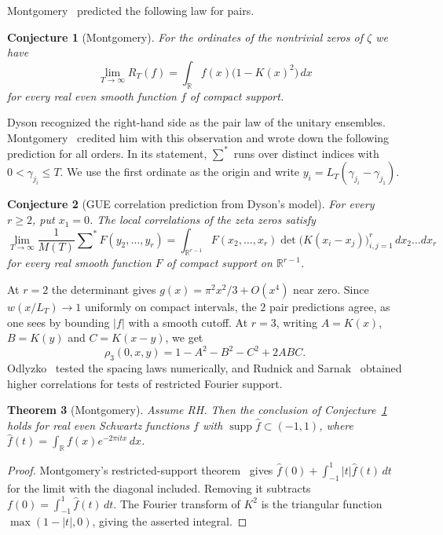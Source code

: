 \documentclass[11pt,a4paper]{article}
\newtheorem{thm}{Theorem}[section]
\newtheorem{conj}[thm]{Conjecture}
\begin{document}
Montgomery~\cite{montgomery} predicted the following law for pairs.

\begin{samepage}
\begin{conj}[Montgomery]\label{pair}
For the ordinates of the nontrivial zeros of $\zeta$ we have
\[
 \lim_{T\to\infty}R_T(f)=\int_{\mathbb R} f(x)\big(1-K(x)^2\big)\,dx
\]
for every real even smooth function $f$ of compact support.
\end{conj}
\end{samepage}

Dyson recognized the right-hand side as the pair law of the unitary ensembles. Montgomery~\cite{montgomery} credited him with this observation and wrote down the following prediction for all orders. In its statement, $\sum^*$ runs over distinct indices with $0<\gamma_{j_i}\leq T$. We use the first ordinate as the origin and write $y_i=L_T(\gamma_{j_i}-\gamma_{j_1})$.

\begin{samepage}
\begin{conj}[GUE correlation prediction from Dyson's model]\label{gue-prediction}
For every $r\geq2$, put $x_1=0$. The local correlations of the zeta zeros satisfy
\[
 \lim_{T\to\infty}\frac1{M(T)}\sum\nolimits^* F(y_2,\ldots,y_r)
 =\int_{\mathbb R^{r-1}} F(x_2,\ldots,x_r)
       \det\big(K(x_i-x_j)\big)_{i,j=1}^r\,dx_2\ldots dx_r
\]
for every real smooth function $F$ of compact support on $\mathbb R^{r-1}$.
\end{conj}
\end{samepage}

At $r=2$ the determinant gives $g(x)=\pi^2x^2/3+O(x^4)$ near zero. Since $w(x/L_T)\to1$ uniformly on compact intervals, the $2$ pair predictions agree, as one sees by bounding $|f|$ with a smooth cutoff. At $r=3$, writing $A=K(x)$, $B=K(y)$ and $C=K(x-y)$, we get
\[
 \rho_3(0,x,y)=1-A^2-B^2-C^2+2ABC.
\]
Odlyzko~\cite{odlyzko} tested the spacing laws numerically, and Rudnick and Sarnak~\cite{rs} obtained higher correlations for tests of restricted Fourier support.

\begin{samepage}
\begin{thm}[Montgomery]\label{restricted-pairs}
Assume RH. Then the conclusion of Conjecture~\textup{\ref{pair}} holds for real even Schwartz functions $f$ with $\operatorname{supp}\widehat f\subset(-1,1)$, where $\widehat f(t)=\int_{\mathbb R}f(x)e^{-2\pi itx}\,dx$.
\end{thm}
\end{samepage}
\begin{proof}
Montgomery's restricted-support theorem~\cite{montgomery} gives $\widehat f(0)+\int_{-1}^1 |t|\widehat f(t)\,dt$ for the limit with the diagonal included. Removing it subtracts $f(0)=\int_{-1}^1\widehat f(t)\,dt$. The Fourier transform of $K^2$ is the triangular function $\max(1-|t|,0)$, giving the asserted integral.
\end{proof}
\end{document}
